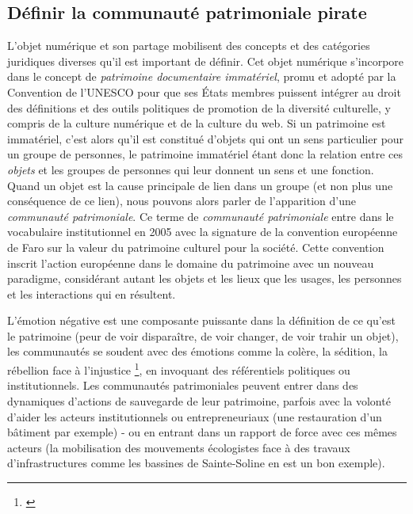 \subsection*{Définir la communauté patrimoniale pirate}

L'objet numérique et son partage mobilisent des concepts et des catégories juridiques diverses qu'il est important de définir. Cet objet numérique s'incorpore dans le concept de \textit{patrimoine documentaire immatériel}, promu et adopté par la Convention de l'UNESCO pour que ses États membres puissent intégrer au droit des définitions et des outils politiques de promotion de la diversité culturelle, y compris de la culture numérique et de la culture du web. Si un patrimoine est immatériel, c'est alors qu'il est constitué d'objets qui ont un sens particulier pour un groupe de personnes, le patrimoine immatériel étant donc la relation entre ces \textit{objets} et les groupes de personnes qui leur donnent un sens et une fonction. Quand un objet est la cause principale de lien dans un groupe (et non plus une conséquence de ce lien), nous pouvons alors parler de l'apparition d'une \textit{communauté patrimoniale}. Ce terme de \textit{communauté patrimoniale} entre dans le vocabulaire institutionnel en 2005 avec la signature de la convention européenne de Faro sur la valeur du patrimoine culturel pour la société. Cette convention inscrit l'action européenne dans le domaine du patrimoine avec un nouveau paradigme, considérant autant les objets et les lieux que les usages, les personnes et les interactions qui en résultent.

L'émotion négative est une composante puissante dans la définition de ce qu'est le patrimoine (peur de voir disparaître, de voir changer, de voir trahir un objet), les communautés se soudent avec des émotions comme la colère, la sédition, la rébellion face à l'injustice \footnote{\cite{fabre_emotions_2013}}, en invoquant des référentiels politiques ou institutionnels.  Les communautés patrimoniales peuvent entrer dans des dynamiques d'actions de sauvegarde de leur patrimoine, parfois avec la volonté d'aider les acteurs institutionnels ou entrepreneuriaux (une restauration d'un bâtiment par exemple) - ou en entrant dans un rapport de force avec ces mêmes acteurs (la mobilisation des mouvements écologistes face à des travaux d'infrastructures comme les bassines de Sainte-Soline en est un bon exemple). 

